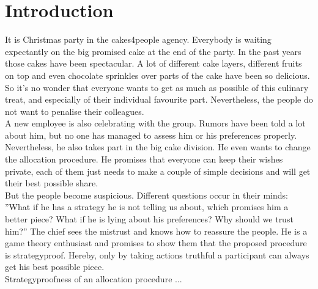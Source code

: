 \section{Introduction}
It is Christmas party in the cakes4people agency. Everybody is waiting expectantly on the big promised cake at the end of the party. In the past years those cakes have been spectacular. A lot of different cake layers, different fruits on top and even chocolate sprinkles over parts of the cake have been so delicious. So it's no wonder that everyone wants to get as much as possible of this culinary treat, and especially of their individual favourite part. Nevertheless, the people do not want to penalise their colleagues.\\A new employee is also celebrating with the group. Rumors have been told a lot about him, but no one has managed to assess him or his preferences properly. Nevertheless, he also takes part in the big cake division. He even wants to change the allocation procedure. He promises that everyone can keep their wishes private, each of them just needs to make a couple of simple decisions and will get their best possible share.\\But the people become suspicious. Different questions occur in their minds: ''What if he has a strategy he is not telling us about, which promises him a better piece? What if he is lying about his preferences? Why should we trust him?''
The chief sees the mistrust and knows how to reassure the people. He is a game theory enthusiast and promises to show them that the proposed procedure is strategyproof. Hereby, only by taking actions truthful a participant can always get his best possible piece.\\
Strategyproofness of an allocation procedure ...
